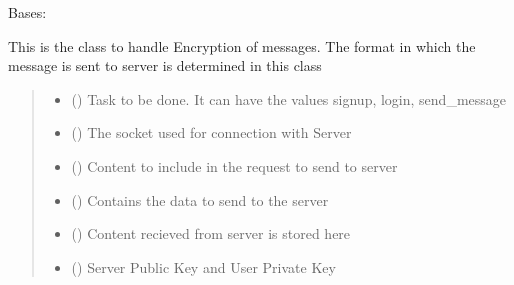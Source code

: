 \documentclass[letterpaper,10pt,english]{sphinxmanual}
\begin{document}
\begin{fulllineitems}
\label{\detokenize{Message:Message.Message}}
\pysigstartsignatures
{}
\pysigstopsignatures
\sphinxAtStartPar
Bases: 

\sphinxAtStartPar
This is the class to handle Encryption of messages. The format in which the message is sent to server is determined in this class
\begin{quote}\begin{description}
\begin{itemize}
\item {} 
\sphinxAtStartPar
{} () \textendash{} Task to be done. It can have the values signup, login, send\_message

\item {} 
\sphinxAtStartPar
{} () \textendash{} The socket used for connection with Server

\item {} 
\sphinxAtStartPar
{} () \textendash{} Content to include in the request to send to server

\item {} 
\sphinxAtStartPar
{} () \textendash{} Contains the data to send to the server

\item {} 
\sphinxAtStartPar
{} () \textendash{} Content recieved from server is stored here

\item {} 
\sphinxAtStartPar
{} () \textendash{} Server Public Key and User Private Key

\end{itemize}


\end{description}
\end{quote}
\end{fulllineitems}
\end{document}
